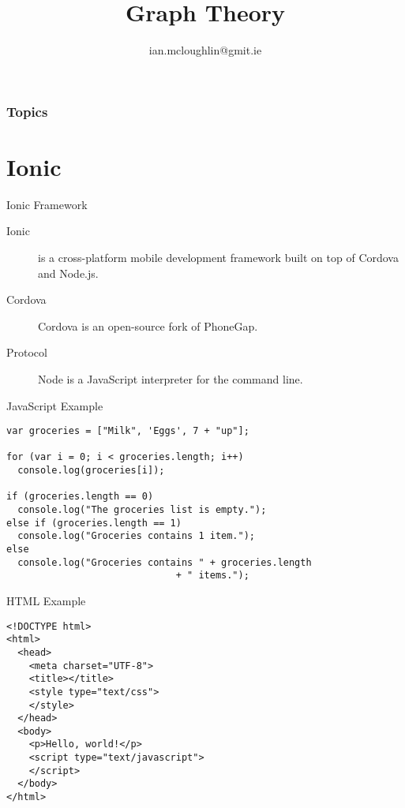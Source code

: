 
\title{Graph Theory}
\subtitle{}
\author{ian.mcloughlin@gmit.ie}
\date{}


\begin{frame}
	\titlepage
\end{frame}

\begin{frame}
	\frametitle{Topics}
	\tableofcontents
\end{frame}

\section{Ionic}

\begin{frame}{Ionic Framework}
  \begin{description}
		\item[Ionic] is a cross-platform mobile development framework built on top of Cordova and Node.js.
    \vspace{0.25cm}
		\item[Cordova] Cordova is an open-source fork of PhoneGap.
    \vspace{0.25cm}
		\item[Protocol] Node is a JavaScript interpreter for the command line.
  \end{description}
\end{frame}


\begin{frame}[fragile]{JavaScript Example}
  \begin{verbatim}
var groceries = ["Milk", 'Eggs', 7 + "up"];

for (var i = 0; i < groceries.length; i++)
  console.log(groceries[i]);

if (groceries.length == 0)
  console.log("The groceries list is empty.");
else if (groceries.length == 1)
  console.log("Groceries contains 1 item.");
else
  console.log("Groceries contains " + groceries.length
                              + " items.");
  \end{verbatim}
\end{frame}


\begin{frame}[fragile]{HTML Example}
  \begin{verbatim}
<!DOCTYPE html>
<html>
  <head>
    <meta charset="UTF-8">
    <title></title>
    <style type="text/css">
    </style>
  </head>
  <body>
    <p>Hello, world!</p>
    <script type="text/javascript">
    </script>
  </body>
</html>
  \end{verbatim}
\end{frame}


